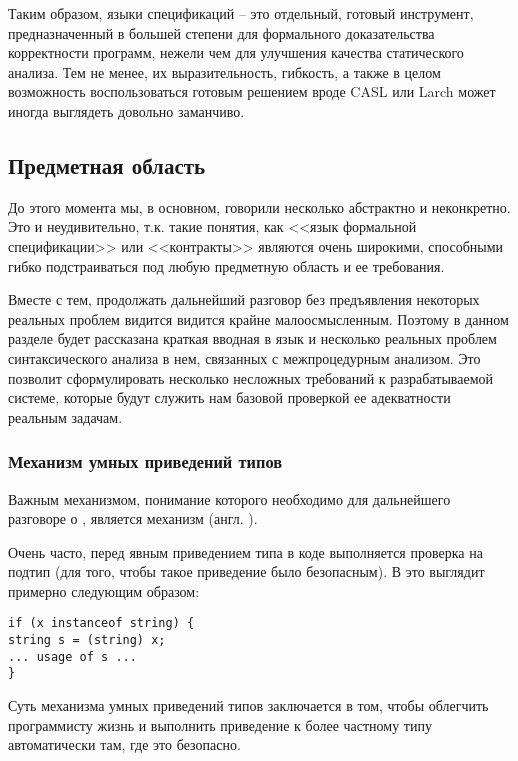 Таким образом, языки спецификаций -- это отдельный, готовый инструмент, предназначенный в большей степени для формального доказательства корректности программ, нежели чем для улучшения качества статического анализа. Тем не менее, их выразительность, гибкость, а также в целом возможность воспользоваться готовым решением вроде CASL или Larch может иногда выглядеть довольно заманчиво.



\newpage



\subsection{Предметная область}

До этого момента мы, в основном, говорили несколько абстрактно и неконкретно. Это и неудивительно, т.к. такие понятия, как <<язык формальной спецификации>> или <<контракты>> являются очень широкими, способными гибко подстраиваться под любую предметную область и ее требования.

Вместе с тем, продолжать дальнейший разговор без предъявления некоторых реальных проблем видится видится крайне малоосмысленным. Поэтому в данном разделе будет рассказана краткая вводная в язык  и несколько реальных проблем синтаксического анализа в нем, связанных с межпроцедурным анализом. Это позволит сформулировать несколько несложных требований к разрабатываемой системе, которые будут служить нам базовой проверкой ее адекватности реальным задачам.


\subsubsection{Механизм умных приведений типов}

Важным механизмом, понимание которого необходимо для дальнейшего разговоре о , является механизм  (англ. ).

Очень часто, перед явным приведением типа в коде выполняется проверка на подтип (для того, чтобы такое приведение было безопасным). В  это выглядит примерно следующим образом:

\begin{verbatim}
if (x instanceof string) {
string s = (string) x;
... usage of s ...
}
\end{verbatim}

Суть механизма умных приведений типов заключается в том, чтобы облегчить программисту жизнь и выполнить приведение к более частному типу автоматически там, где это безопасно.

